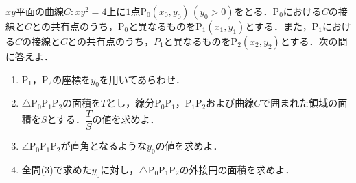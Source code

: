 \documentclass[../../main.tex]{subfiles}
\begin{document}
$xy$平面の曲線$C:xy^2=4$上に$1$点$\mathrm{P}_0(x_0,y_0)\, (y_0>0)$をとる．$\mathrm{P}_0$における$C$の接線と$C$との共有点のうち，$\mathrm{P}_0$と異なるものを$\mathrm{P}_1(x_1,y_1)$とする．また，$\mathrm{P}_1$における$C$の接線と$C$との共有点のうち，$P_1$と異なるものを$\mathrm{P}_2(x_2,y_2)$とする．次の問に答えよ．
\begin{enumerate}
  \item $\mathrm{P}_1$，$\mathrm{P}_2$の座標を$y_0$を用いてあらわせ．
  \item $\triangle \mathrm{P_0P_1P_2}$の面積を$T$とし，線分$\mathrm{P_0P_1}$，$\mathrm{P_1P_2}$および曲線$C$で囲まれた領域の面積を$S$とする．$\dfrac{T}{S}$の値を求めよ．
  \item $\angle \mathrm{P_0P_1P_2}$が直角となるような$y_0$の値を求めよ．
  \item 全問(3)で求めた$y_0$に対し，$\triangle \mathrm{P_0P_1P_2}$の外接円の面積を求めよ．
\end{enumerate}
\end{document}
